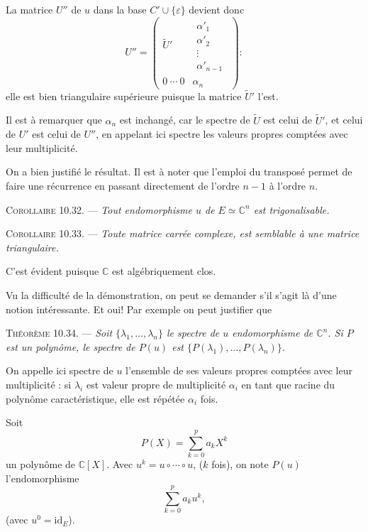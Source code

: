 La matrice $U''$ de $u$ dans la base $C'\cup\{\varepsilon\}$ devient donc
\[
U''=
\begin{pmatrix}
\widetilde U'&\begin{matrix}\alpha'_1\\\alpha'_2\\\vdots\\\alpha'_{n-1}\end{matrix}\\
0\ \cdots\ 0&\alpha_n
\end{pmatrix}:
\]
elle est bien triangulaire supérieure puisque la matrice $\widetilde U'$ l'est.

Il est à remarquer que $\alpha_n$ est inchangé, car le spectre de $\widetilde U$ est celui de $\widetilde U'$, et celui de $U'$ est celui de $U''$, en appelant ici spectre les valeurs propres comptées avec leur multiplicité.

On a bien justifié le résultat. Il est à noter que l'emploi du transposé permet de faire une récurrence en passant directement de l'ordre $n-1$ à l'ordre $n$. \bookend

\medskip\noindent\textsc{Corollaire 10.32.} --- \emph{Tout endomorphisme $u$ de $E\simeq\mathbb C^n$ est trigonalisable.}

\medskip\noindent\textsc{Corollaire 10.33.} --- \emph{Toute matrice carrée complexe, est semblable à une matrice triangulaire.}

C'est évident puisque $\mathbb C$ est algébriquement clos.

Vu la difficulté de la démonstration, on peut se demander s'il s'agit là d'une notion intéressante. Et oui! Par exemple on peut justifier que

\medskip\noindent\textsc{Théorème 10.34.} --- \emph{Soit $\{\lambda_1,\ldots,\lambda_n\}$ le spectre de $u$ endomorphisme de $\mathbb C^n$. Si $P$ est un polynôme, le spectre de $P(u)$ est $\{P(\lambda_1),\ldots,P(\lambda_n)\}$.}

On appelle ici spectre de $u$ l'ensemble de ses valeurs propres comptées avec leur multiplicité : si $\lambda_i$ est valeur propre de multiplicité $\alpha_i$ en tant que racine du polynôme caractéristique, elle est répétée $\alpha_i$ fois.

Soit
\[
P(X)=\sum_{k=0}^pa_kX^k
\]
un polynôme de $\mathbb C[X]$. Avec $u^k=u\circ\cdots\circ u$, ($k$ fois), on note $P(u)$ l'endomorphisme
\[
\sum_{k=0}^pa_ku^k,
\]
(avec $u^0=\mathrm{id}_E$).

